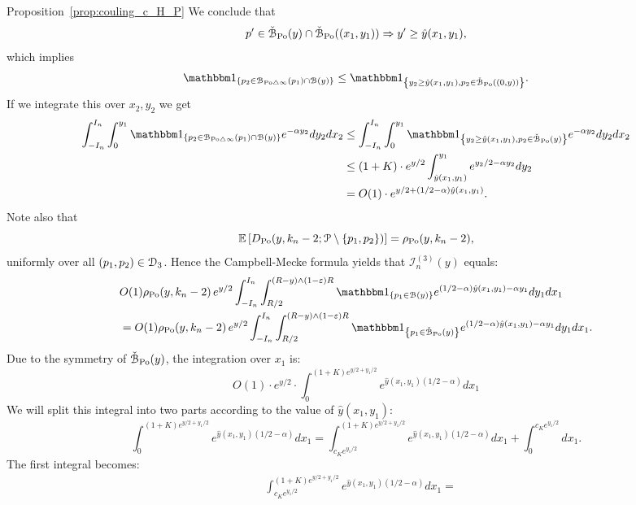 \begin{proofof}{Proposition~\ref{prop:couling_c_H_P}}
We conclude that 
\begin{equation*}%
	p^\prime \in \FatBallHyp{y}\cap \FatBallHyp{(x_1,y_1)} \Rightarrow y^\prime \ge \hat{y}(x_1,y_1),
\end{equation*}
which implies
\begin{equation} \label{eq:symdiff_loc}
\begin{split} 
 \ind{p_2 \in \BallSym{p_1}\cap \BallHyp{y}} \leq \ind{y_2 \geq \hat{y}(x_1,y_1), p_2 \in \FatBallHyp{(0,y)}}.
\end{split}
\end{equation}
If we integrate this over $x_2, y_2$ we get 
\begin{align*}
\int_{-I_n}^{I_n} \int_{0}^{y_1}  \ind{p_2 \in \BallSym{p_1}\cap \BallHyp{y}}  
e^{-\alpha y_2} dy_2 dx_2
&  \leq 
\int_{-I_n}^{I_n} \int_{0}^{y_1}  \ind{y_2 \geq \hat{y}(x_1,y_1), p_2 \in \FatBallHyp{y}}  
e^{-\alpha y_2} dy_2 dx_2 \\
&\leq (1+K) \cdot e^{y/2} \int_{\hat{y}(x_1,y_1)}^{y_1} e^{y_2/2 - \alpha y_2} dy_2 \\
&=O(1) \cdot e^{y/2 + (1/2 -\alpha) \hat{y}(x_1,y_1)}.
\end{align*}
Note also that 
\[
	\mathbb{E}\left[D_{{\mathrm{Po}}} (y,k_n-2;{\mathcal P} \setminus \{p_1, p_2\})\right] = \rho_{{\mathrm{Po}}}(y,k_n-2),
\]
uniformly over all $(p_1, p_2) \in \mathcal{D}_{3}$. Hence the Campbell-Mecke formula yields that $\mathcal{I}_n^{(3)}(y)$ equals: 
\begin{align*}
 	&O(1) \rho_{\Po}(y,k_n-2) \, e^{y/2} \int_{-I_n}^{I_n} \int_{R/2}^{(R - y) \wedge (1-\eps)R}  
		\ind{p_1 \in \BallHyp{y}} e^{(1/2 -\alpha) \hat{y}(x_1,y_1) - \alpha y_1} dy_1dx_1 \\
	&= O(1) \rho_{\Po}(y,k_n-2) \, e^{y/2} \int_{-I_n}^{I_n} \int_{R/2}^{(R - y) \wedge (1-\eps)R}  
		\ind{p_1 \in \FatBallHyp{y}} e^{(1/2 -\alpha) \hat{y}(x_1,y_1) - \alpha y_1} dy_1dx_1.
\end{align*}
Due to the symmetry of $\check{{\mathcal B}}_{{\mathrm{Po}}}(y)$, the integration over $x_1$ is: 
\[
	O(1) \cdot e^{y/2} \cdot \int_0^{(1+K)e^{y/2 + y_1/2}} e^{\hat{y}(x_1,y_1) (1/2 -\alpha)} dx_1
\]
We will split this integral into two parts according to the value of $\hat{y}(x_1,y_1)$:
\[
\int_0^{(1+K) e^{y/2 + y_1/2}} e^{\hat{y}(x_1,y_1) (1/2 -\alpha)} dx_1 = 
\int_{c_K e^{y_1/2}}^{(1+K)e^{y/2 + y_1/2}} e^{\hat{y}(x_1,y_1) (1/2 -\alpha)} dx_1 + \int_0^{c_K e^{y_1/2}} dx_1.
\]
The first integral becomes: 
\begin{align*}
&\int_{c_K e^{y_1/2}}^{(1+K)e^{y/2 + y_1/2}} e^{\hat{y}(x_1,y_1) (1/2 -\alpha)} dx_1  = 

\end{align*}
\end{proofof}
